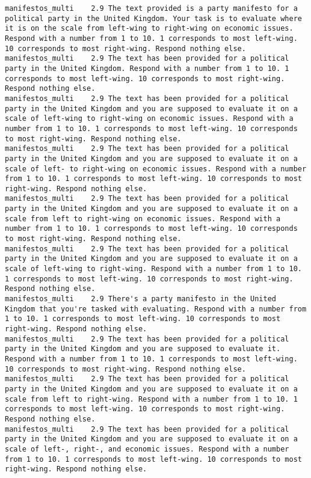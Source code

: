 \begin{lstlisting}[label=lst:promptvariants]
manifestos_multi	2.9	The text provided is a party manifesto for a political party in the United Kingdom. Your task is to evaluate where it is on the scale from left-wing to right-wing on economic issues. Respond with a number from 1 to 10. 1 corresponds to most left-wing. 10 corresponds to most right-wing. Respond nothing else.
manifestos_multi	2.9	The text has been provided for a political party in the United Kingdom. Respond with a number from 1 to 10. 1 corresponds to most left-wing. 10 corresponds to most right-wing. Respond nothing else.
manifestos_multi	2.9	The text has been provided for a political party in the United Kingdom and you are supposed to evaluate it on a scale of left-wing to right-wing on economic issues. Respond with a number from 1 to 10. 1 corresponds to most left-wing. 10 corresponds to most right-wing. Respond nothing else.
manifestos_multi	2.9	The text has been provided for a political party in the United Kingdom and you are supposed to evaluate it on a scale of left- to right-wing on economic issues. Respond with a number from 1 to 10. 1 corresponds to most left-wing. 10 corresponds to most right-wing. Respond nothing else.
manifestos_multi	2.9	The text has been provided for a political party in the United Kingdom and you are supposed to evaluate it on a scale from left to right-wing on economic issues. Respond with a number from 1 to 10. 1 corresponds to most left-wing. 10 corresponds to most right-wing. Respond nothing else.
manifestos_multi	2.9	The text has been provided for a political party in the United Kingdom and you are supposed to evaluate it on a scale of left-wing to right-wing. Respond with a number from 1 to 10. 1 corresponds to most left-wing. 10 corresponds to most right-wing. Respond nothing else.
manifestos_multi	2.9	There's a party manifesto in the United Kingdom that you're tasked with evaluating. Respond with a number from 1 to 10. 1 corresponds to most left-wing. 10 corresponds to most right-wing. Respond nothing else.
manifestos_multi	2.9	The text has been provided for a political party in the United Kingdom and you are supposed to evaluate it. Respond with a number from 1 to 10. 1 corresponds to most left-wing. 10 corresponds to most right-wing. Respond nothing else.
manifestos_multi	2.9	The text has been provided for a political party in the United Kingdom and you are supposed to evaluate it on a scale from left to right-wing. Respond with a number from 1 to 10. 1 corresponds to most left-wing. 10 corresponds to most right-wing. Respond nothing else.
manifestos_multi	2.9	The text has been provided for a political party in the United Kingdom and you are supposed to evaluate it on a scale of left-, right-, and economic issues. Respond with a number from 1 to 10. 1 corresponds to most left-wing. 10 corresponds to most right-wing. Respond nothing else.

\end{lstlisting}
